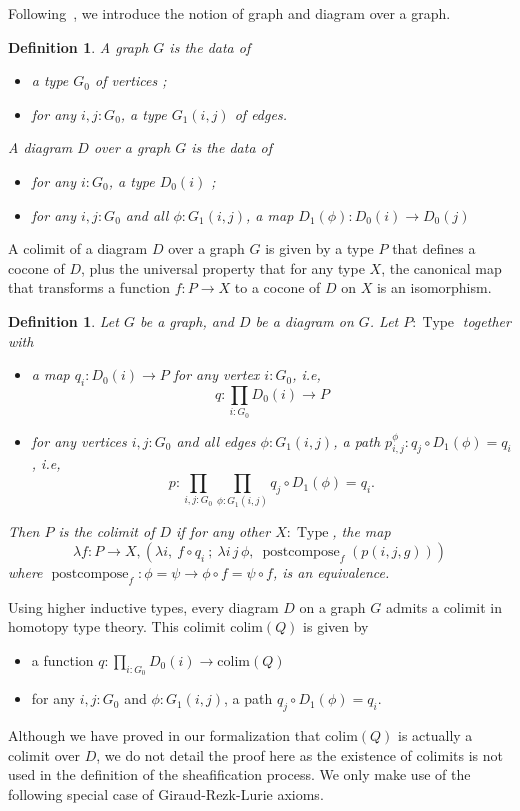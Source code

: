 \documentclass[conference]{IEEEtran}
\newtheorem{defi}[thm]{Definition}
\newcommand{\ie}{i.e,\xspace}
\DeclareMathOperator{\Type}{Type}
\DeclareMathOperator{\postcompose}{\mathrm{postcompose}}
\newcommand \colim[1] {\mathrm{colim}(Q)}
\begin{document}
Following~\cite{lumsdaine}, we introduce the notion of graph and
diagram over a graph.
%
\begin{defi}
  A {\em graph} $G$ is the data of
  \begin{itemize}
  \item a type $G_0$ of vertices ;
  \item for any $i,j:G_0$, a type $G_1(i,j)$ of edges.
  \end{itemize}

  A {\em diagram} $D$ over a graph $G$ is the data of
  \begin{itemize}
  \item for any $i:G_0$, a type $D_0(i)$ ;
  \item for any $i,j:G_0$ and all $\phi : G_1(i,j)$, a map $D_1(\phi)
    : D_0(i) \to D_0(j)$
  \end{itemize}
\end{defi}

A colimit of a diagram $D$ over a graph $G$ is given by a type $P$
that defines a cocone of $D$, plus the universal property that for any
type $X$, the canonical map that transforms a function $f : P
\rightarrow X$ to a cocone of $D$ on $X$ is an isomorphism.
% 
\begin{defi}
Let $G$ be a graph, and $D$ be a diagram on $G$. 
Let $P:\Type$ together with
\begin{itemize}
\item a map $q_i : D_0(i) \to P$ for any
vertex $i:G_0$, \ie $$q : \prod_{i:G_0} D_0(i) \to P$$
\item for any vertices $i,j:G_0$ and all edges $\phi:G_1(i,j)$, a path
  $p_{i,j}^\phi : q_j \circ D_1(\phi) = q_i$, \ie
  $$p : \prod_{i,j:G_0} \prod_{\phi:G_1(i,j)} q_j \circ D_1(\phi) = q_i.$$
\end{itemize}

Then $P$ is the {\em colimit} of $D$ if for any other $X:\Type$, the
map
$$\lambda f:P \to X, \left( \lambda i,~f \circ q_i~;~ \lambda i\, j\,
  \phi,~ \postcompose_f (p(i, j, g)) \right)$$
where $\postcompose_f : \phi = \psi \to \phi \circ f = \psi \circ f$,
is an equivalence.
\end{defi}


Using higher inductive types, every diagram $D$ on a graph $G$ admits a
colimit in homotopy type theory. This colimit $\colim D$ is given by
%
\begin{itemize}
\item a function $q:\prod_{i:G_0} D_0(i) \to \colim D$
\item for any $i,j:G_0$ and $\phi:G_1(i,j)$, a path
  $q_j \circ D_1(\phi) = q_i$.
\end{itemize}
%
Although we have proved in our formalization that $\colim D$ is
actually a colimit over $D$, we do not detail the proof here as the
existence of colimits is not used in the definition of the
sheafification process. We only make use of the following special case
of Giraud-Rezk-Lurie axioms.
\end{document}
